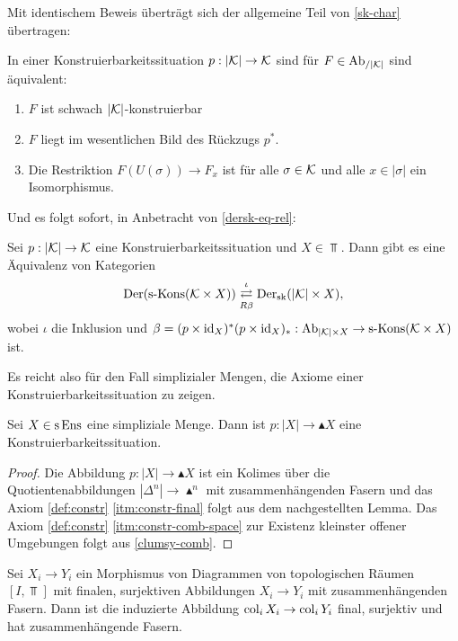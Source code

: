 Mit identischem Beweis überträgt sich der allgemeine Teil von
\ref{sk-char} übertragen:
\begin{prop} \label{gensk-char}
  In einer Konstruierbarkeitssituation $p: |\mathcal{K}| \to \mathcal{K}$ sind für $F
  \in \operatorname{Ab}_{/|\mathcal{K}|}$ sind äquivalent:
  \begin{enumerate}[label=(\arabic*)]
  \item \label{itm:gensk-char-sk} $F$ ist schwach $|\mathcal{K}|$-konstruierbar
  \item \label{itm:gensk-char-essim} $F$ liegt im wesentlichen Bild
    des Rückzugs $p^*$.
  \item \label{itm:gensk-char-res} Die Restriktion $F(U(\sigma)) \to
    F_x$ ist für alle $\sigma \in \mathcal{K}$ und alle $x \in |\sigma|$ ein
    Isomorphismus.
  \end{enumerate}
\end{prop}
Und es folgt sofort, in Anbetracht von \ref{dersk-eq-rel}:
\begin{theorem}
  Sei $p: |\mathcal{K}| \to \mathcal{K}$ eine Konstruierbarkeitssituation und $X \in
  \Top$.  Dann gibt es eine Äquivalenz von Kategorien
  \[ \operatorname{Der}(\operatorname{s-Kons}(\mathcal{K} \times X))
     \mathrel{\mathop{\rightleftarrows}^{\iota}_{R \beta}}
     \operatorname{Der}_{\mathrm{sk}}(|\mathcal{K}| \times X),
  \]
  wobei $\iota$ die Inklusion und $\beta = (p \times \operatorname{id}_X)^* (p
  \times \operatorname{id}_X)_*: \operatorname{Ab}_{|\mathcal{K}| \times X} \to \operatorname{s-Kons}(\mathcal{K} \times X)$ ist.
\end{theorem}
Es reicht also für den Fall simplizialer Mengen, die Axiome einer
Konstruierbarkeitssituation zu zeigen.
\begin{prop}
  Sei $X \in \operatorname{s}\operatorname{Ens}$ eine simpliziale Menge. Dann ist $p: |X| \to
  \blacktriangle X$ eine Konstruierbarkeitssituation.
\end{prop}
\begin{proof}
  Die Abbildung $p: |X| \to \blacktriangle X$ ist ein Kolimes über die
  Quotientenabbildungen $|\Delta^n| \to \blacktriangle^n$ mit
  zusammenhängenden Fasern und das Axiom \ref{def:constr}
  \ref{itm:constr-final} folgt aus dem nachgestellten Lemma. Das Axiom
  \ref{def:constr} \ref{itm:constr-comb-space} zur Existenz kleinster
  offener Umgebungen folgt aus \ref{clumsy-comb}.
\end{proof}
\begin{lemma}
  Sei $X_i \to Y_i$ ein Morphismus von Diagrammen von topologischen
  Räumen $[I, \Top]$ mit finalen, surjektiven Abbildungen $X_i \to
  Y_i$ mit zusammenhängenden Fasern. Dann ist die induzierte Abbildung
  $\operatorname{col}_i X_i \to \operatorname{col}_i Y_i$ final, surjektiv und hat
  zusammenhängende Fasern.
\end{lemma}
